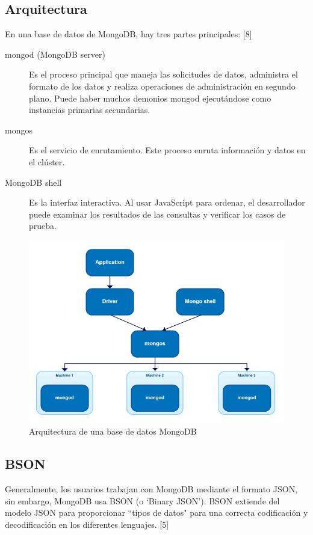 \documentclass[twocolumn]{article}
\begin{document}
\subsection{Arquitectura}

En una base de datos de MongoDB, hay tres partes principales: [8]

\begin{description}
  \item[mongod (MongoDB server)] Es el proceso principal que maneja las solicitudes de datos, administra el formato de los datos y realiza operaciones de administración en segundo plano. Puede haber muchos demonios mongod ejecutándose como instancias primarias secundarias.
  \item[mongos] Es el servicio de enrutamiento. Este proceso enruta información y datos en el clúster.
  \item[MongoDB shell] Es la interfaz interactiva. Al usar JavaScript para ordenar, el desarrollador puede examinar los resultados de las consultas y verificar los casos de prueba.
\end{description}

\begin{figure}[h]
  \includegraphics[width = \columnwidth]{img/01_mongo.png}
  \caption{Arquitectura de una base de datos MongoDB}
\end{figure}

\subsection{BSON}

Generalmente, los usuarios trabajan con MongoDB mediante el formato JSON, sin embargo, MongoDB usa BSON (o `Binary JSON'). BSON extiende del modelo JSON para proporcionar ``tipos de datos" para una correcta codificación y decodificación en los diferentes lenguajes. [5]
\end{document}
